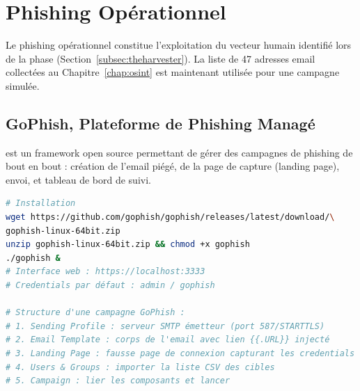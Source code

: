 \section{Phishing Opérationnel}
\label{sec:phishing_ops}

Le phishing opérationnel constitue l'exploitation du vecteur humain identifié
lors de la phase  (Section~\ref{subsec:theharvester}). La liste
de 47 adresses email collectées au Chapitre~\ref{chap:osint} est maintenant
utilisée pour une campagne simulée.

\subsection{GoPhish, Plateforme de Phishing Managé}
\label{subsec:gophish}

 est un framework open source permettant de gérer des
campagnes de phishing de bout en bout : création de l'email piégé, de la
page de capture (landing page), envoi, et tableau de bord de suivi.

\begin{lstlisting}[language=bash, caption={Déploiement et configuration GoPhish}]
# Installation
wget https://github.com/gophish/gophish/releases/latest/download/\
gophish-linux-64bit.zip
unzip gophish-linux-64bit.zip && chmod +x gophish
./gophish &
# Interface web : https://localhost:3333
# Credentials par défaut : admin / gophish

# Structure d'une campagne GoPhish :
# 1. Sending Profile : serveur SMTP émetteur (port 587/STARTTLS)
# 2. Email Template : corps de l'email avec lien {{.URL}} injecté
# 3. Landing Page : fausse page de connexion capturant les credentials
# 4. Users & Groups : importer la liste CSV des cibles
# 5. Campaign : lier les composants et lancer
\end{lstlisting}

